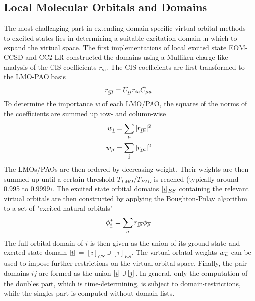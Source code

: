 \subsection{Local Molecular Orbitals and Domains}

The most challenging part in extending domain-specific virtual orbital methods to excited states lies in determining a suitable excitation domain in which to expand the virtual space. The first implementations of local excited state EOM-CCSD \cite{Cra2002,Kor2003} and CC2-LR \cite{Kat2006} constructed the domains using a Mulliken-charge like analysis of the CIS coefficients $r_{ia}$. The CIS coefficients are first transformed to the LMO-PAO basis
\begin{equation}
r_{\underline{i} \overline{\mu}} = U_{\underline{i} i } r_{ia} \bar{C}_{\mu a} 
\end{equation}
\noindent To determine the importance $w$ of each LMO/PAO, the squares of the norms of the coefficients are summed up row- and column-wise
\begin{equation}
\begin{split}
w_{\underline{i}} &= \sum_{\mu} |r_{\underline{i} \overline{\mu}}|^2 \\
w_{\overline{\mu}} &= \sum_{\underline{i}} |r_{\underline{i} \overline{\mu}}|^2
\end{split}
\end{equation}
\noindent The LMOs/PAOs are then ordered by decreasing weight. Their weights are then summed up until a certain threshold $T_{LMO}$/$T_{PAO}$ is reached (typically around 0.995 to 0.9999). The excited state orbital domains $[\underline{i}]_{ES}$ containing the relevant virtual orbitals are then constructed by applying the Boughton-Pulay algorithm to a set of "excited natural orbitals" \cite{Kor2003}
\begin{equation}
\phi_{\underline{i}}^* = \sum_{\overline{a}} r_{\underline{i} \overline{\mu}} \phi_{\overline{\mu}}  
\end{equation} 
\noindent The full orbital domain of $i$ is then given as the union of its ground-state and excited state domain $[\underline{i}]$ = $[i]_{GS} \cup [i]_{ES}$. The virtual orbital weights $w_{\overline{\mu}}$ can be used to impose further restrictions on the virtual orbital space. Finally, the pair domains $ij$ are formed as the union $[\underline{i}] \cup [\underline{j}]$. In general, only the computation of the doubles part, which is time-determining, is subject to domain-restrictions, while the singles part is computed without domain lists.

